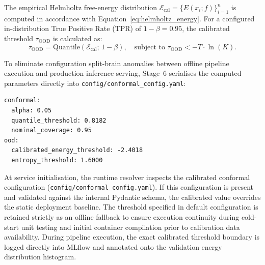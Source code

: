 The empirical Helmholtz free-energy distribution $\mathcal{E}_{\text{cal}} = \{E(x_i; f)\}_{i=1}^n$ is computed in accordance with Equation~\ref{eq:helmholtz_energy}. For a configured in-distribution True Positive Rate (TPR) of $1 - \beta = 0.95$, the calibrated threshold $\tau_{\text{OOD}}$ is calculated as:
\begin{equation}
    \tau_{\text{OOD}} = \text{Quantile}\left(\mathcal{E}_{\text{cal}}; \, 1 - \beta\right), \quad \text{subject to } \tau_{\text{OOD}} < -T \cdot \ln(K).
    \label{eq:calibrated_tau_ood}
\end{equation}

To eliminate configuration split-brain anomalies between offline pipeline execution and production inference serving, Stage~6 serialises the computed parameters directly into \nolinkurl{config/conformal_config.yaml}:
\begin{verbatim}
conformal:
  alpha: 0.05
  quantile_threshold: 0.8182
  nominal_coverage: 0.95
ood:
  calibrated_energy_threshold: -2.4018
  entropy_threshold: 1.6000
\end{verbatim}

At service initialisation, the runtime resolver inspects the calibrated conformal configuration (\texttt{config/}\allowbreak\texttt{conformal\_config.yaml}). If this configuration is present and validated against the internal Pydantic schema, the calibrated value overrides the static deployment baseline. The threshold specified in default configuration is retained strictly as an offline fallback to ensure execution continuity during cold-start unit testing and initial container compilation prior to calibration data availability. During pipeline execution, the exact calibrated threshold boundary is logged directly into MLflow and annotated onto the validation energy distribution histogram.

